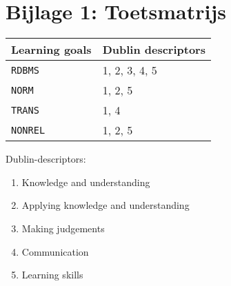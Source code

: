 \section*{Bijlage 1: Toetsmatrijs}
	\begin{tabular}{|p{1cm}|p{4cm}|}
		\hline
		Learning goals & Dublin descriptors \\
		\hline
		\texttt{RDBMS} & 1, 2, 3, 4, 5 \\
		\hline
		\texttt{NORM} & 1, 2, 5 \\
		\hline
		\texttt{TRANS} & 1, 4 \\
		\hline
		\texttt{NONREL} & 1, 2, 5 \\
		\hline
	\end{tabular}
	
	\vspace{1cm}

	Dublin-descriptors:
	\begin{enumerate}
		\item Knowledge and understanding
		\item Applying knowledge and understanding
		\item Making judgements
		\item Communication
		\item Learning skills
	\end{enumerate}
